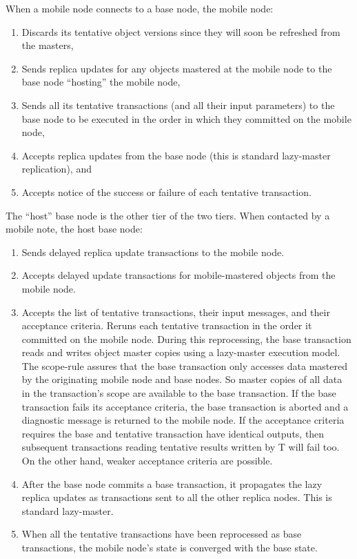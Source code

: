 \documentclass[a4paper,11pt,twoside,openright]{article}
\begin{document}
When a mobile node connects to a base node, the mobile node:

\begin{enumerate}
\def\labelenumi{\arabic{enumi}.}
\item
  Discards its tentative object versions since they will soon be
  refreshed from the masters,
\item
  Sends replica updates for any objects mastered at the mobile node to
  the base node ``hosting'' the mobile node,
\item
  Sends all its tentative transactions (and all their input parameters)
  to the base node to be executed in the order in which they committed
  on the mobile node,
\item
  Accepts replica updates from the base node (this is standard
  lazy-master replication), and
\item
  Accepts notice of the success or failure of each tentative
  transaction.
\end{enumerate}

The ``host'' base node is the other tier of the two tiers. When
contacted by a mobile note, the host base node:

\begin{enumerate}
\def\labelenumi{\arabic{enumi}.}
\item
  Sends delayed replica update transactions to the mobile node.
\item
  Accepts delayed update transactions for mobile-mastered objects from
  the mobile node.
\item
  Accepts the list of tentative transactions, their input messages, and
  their acceptance criteria. Reruns each tentative transaction in the
  order it committed on the mobile node. During this reprocessing, the
  base transaction reads and writes object master copies using a
  lazy-master execution model. The scope-rule assures that the base
  transaction only accesses data mastered by the originating mobile node
  and base nodes. So master copies of all data in the transaction's
  scope are available to the base transaction. If the base transaction
  fails its acceptance criteria, the base transaction is aborted and a
  diagnostic message is returned to the mobile node. If the acceptance
  criteria requires the base and tentative transaction have identical
  outputs, then subsequent transactions reading tentative results
  written by T will fail too. On the other hand, weaker acceptance
  criteria are possible.
\item
  After the base node commits a base transaction, it propagates the lazy
  replica updates as transactions sent to all the other replica nodes.
  This is standard lazy-master.
\item
  When all the tentative transactions have been reprocessed as base
  transactions, the mobile node's state is converged with the base
  state.
\end{enumerate}
\end{document}
